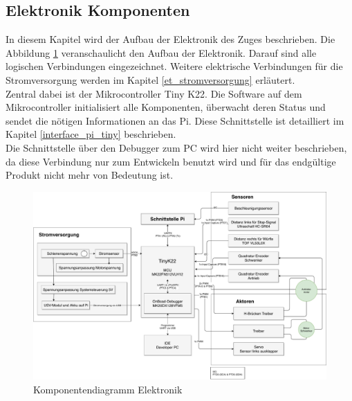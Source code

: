 \documentclass[../../main.tex]{subfiles}
\begin{document}
    \subsection{Elektronik Komponenten}
    In diesem Kapitel wird der Aufbau der Elektronik des Zuges beschrieben. Die Abbildung \ref{fig:et_komponenten} veranschaulicht den Aufbau der Elektronik. Darauf sind alle logischen Verbindungen eingezeichnet. Weitere elektrische Verbindungen für die Stromversorgung werden im Kapitel \ref{et_stromversorgung} erläutert.\\
    Zentral dabei ist der Mikrocontroller Tiny K22. Die Software auf dem Mikrocontroller initialisiert alle Komponenten, überwacht deren Status und sendet die nötigen Informationen an  das Pi. Diese Schnittstelle ist detailliert im Kapitel \ref{interface_pi_tiny} beschrieben.\\
    Die Schnittstelle über den Debugger zum PC wird hier nicht weiter beschrieben, da diese Verbindung nur zum Entwickeln benutzt wird und für das endgültige Produkt nicht mehr von Bedeutung ist.

    \begin{figure}[H]
        \centering
        \includegraphics[width=1.0\textwidth]{../../drawings/KomponentenDiagramm/KomponentenDiagramm_ET.pdf}
        \caption {Komponentendiagramm Elektronik}
        \label{fig:et_komponenten}
    \end{figure}
\end{document}
